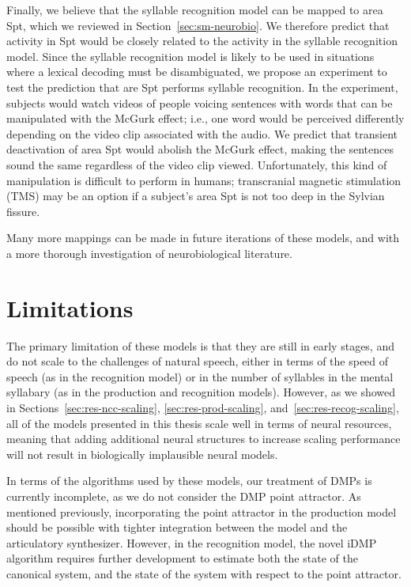 Finally, we believe that
the syllable recognition model
can be mapped to area Spt,
which we reviewed
in Section~\ref{sec:sm-neurobio}.
We therefore predict that
activity in Spt would
be closely related to the activity
in the syllable recognition model.
Since the syllable recognition model
is likely to be used in situations
where a lexical decoding must be
disambiguated,
we propose an experiment to test
the prediction that are Spt
performs syllable recognition.
In the experiment,
subjects would watch videos
of people voicing sentences
with words that can be manipulated
with the McGurk effect;
i.e., one word would be perceived
differently depending on the
video clip associated with the audio.
We predict that transient
deactivation of area Spt would
abolish the McGurk effect,
making the sentences sound the same
regardless of the video clip viewed.
Unfortunately, this kind of manipulation
is difficult to perform in humans;
transcranial magnetic stimulation (TMS)
may be an option if a subject's
area Spt is not too deep in the
Sylvian fissure.

Many more mappings can be made
in future iterations of these models,
and with a more thorough investigation
of neurobiological literature.

\section{Limitations}

The primary limitation of these models
is that they are still in early stages,
and do not scale to the challenges
of natural speech,
either in terms of the speed
of speech (as in the recognition model)
or in the number of syllables
in the mental syllabary
(as in the production and recognition models).
However, as we showed in
Sections~\ref{sec:res-ncc-scaling},
\ref{sec:res-prod-scaling},
and~\ref{sec:res-recog-scaling},
all of the models presented in this thesis
scale well in terms of neural resources,
meaning that adding additional neural structures
to increase scaling performance
will not result in biologically implausible
neural models.

In terms of the algorithms used
by these models,
our treatment of DMPs is currently incomplete,
as we do not consider
the DMP point attractor.
As mentioned previously,
incorporating the point attractor
in the production model
should be possible with tighter integration
between the model
and the articulatory synthesizer.
However, in the recognition model,
the novel iDMP algorithm
requires further development
to estimate both the state of the
canonical system,
and the state of the system
with respect to the point attractor.

